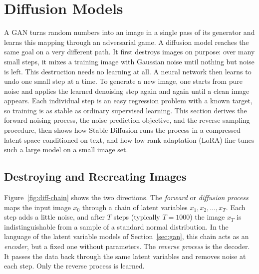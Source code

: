 \section{Diffusion Models}
\label{sec:diffusion}

A GAN turns random numbers into an image in a single pass of its generator and
learns this mapping through an adversarial game. A diffusion model reaches the
same goal on a very different path. It first destroys images on purpose: over
many small steps, it mixes a training image with Gaussian noise until nothing
but noise is left. This destruction needs no learning at all. A neural network
then learns to undo one small step at a time. To generate a new image, one
starts from pure noise and applies the learned denoising step again and again
until a clean image appears. Each individual step is an easy regression
problem with a known target, so training is as stable as ordinary supervised
learning. This section derives the forward noising process, the noise
prediction objective, and the reverse sampling procedure, then shows how
Stable Diffusion runs the process in a compressed latent space conditioned on
text, and how low-rank adaptation (LoRA) fine-tunes such a large model on a
small image set.

\subsection{Destroying and Recreating Images}

Figure~\ref{fig:diff-chain} shows the two directions. The \emph{forward} or
\emph{diffusion process} maps the input image $x_0$ through a chain of latent
variables $x_1,x_2,\dots,x_T$. Each step adds a little noise, and after
$T$ steps (typically $T=1000$) the image $x_T$ is indistinguishable from a
sample of a standard normal distribution. In the language of the latent
variable models of Section~\ref{sec:gan}, this chain acts as an
\emph{encoder}, but a fixed one without parameters. The \emph{reverse process}
is the decoder. It passes the data back through the same latent variables and
removes noise at each step. Only the reverse process is learned.

